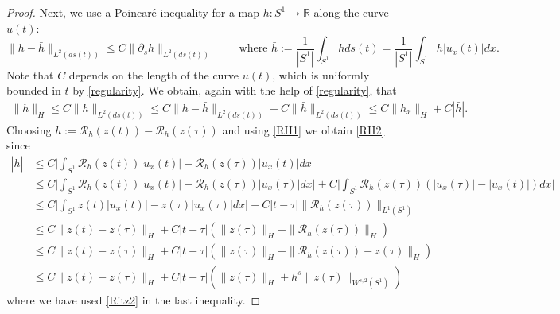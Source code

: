 \documentclass[10pt,a4paper]{amsart}
\def\funch{h}
\newcommand{\R}{\mathbb{R}}
\begin{document}
\begin{proof}
Next, we use a Poincar\'{e}-inequality for a map $\funch:S^{1} \to \R$ along the curve $u(t)$:
$$\| \funch - \bar{h}\|_{L^{2}(ds(t))} \leq C\| \partial_{s} \funch \|_{L^{2}(ds(t))} \qquad \text{ where } \bar{h}:= \frac{1}{|S^{1}|}\int_{S^{1}} \funch ds(t)= \frac{1}{|S^{1}|}\int_{S^{1}} \funch |u_{x}(t)| dx.$$
Note that $C$ depends on the length of the curve $u(t)$, which is uniformly bounded in $t$ by \eqref{regularity}. We obtain, again with the help of \eqref{regularity}, that
\begin{align*}
\|\funch\|_{H} \leq C \| \funch\|_{L^{2}(ds(t))} \leq C\| \funch - \bar{h}\|_{L^{2}(ds(t))} + C\| \bar{h}\|_{L^{2}(ds(t))} \leq C \| \funch_{x}\|_{H} + C |\bar{h}|.
\end{align*}
Choosing $\funch:=\mathcal{R}_{h} (z(t)) -\mathcal{R}_{h} (z(\tau)) $ and using \eqref{RH1} we obtain \eqref{RH2} since
\begin{align*}
|\bar{h}| &\leq C \Big|\int_{S^{1}} \mathcal{R}_{h} (z(t)) |u_{x}(t)| - \mathcal{R}_{h} (z(\tau)) |u_{x}(t)| dx \Big|\\
&\leq C \Big|\int_{S^{1}} \mathcal{R}_{h} (z(t)) |u_{x}(t)| - \mathcal{R}_{h} (z(\tau)) |u_{x}(\tau)| dx \Big| + C \Big|\int_{S^{1}} \mathcal{R}_{h} (z(\tau)) ( |u_{x}(\tau)| - |u_{x}(t)|) dx \Big|\\
& \leq C \Big|\int_{S^{1}} z(t) |u_{x}(t)| - z(\tau) |u_{x}(\tau)| dx \Big| + C |t -\tau| \| \mathcal{R}_{h} (z(\tau)) \|_{L^{1}(S^{1})}\\
& \leq C \| z(t) -z(\tau)\|_{H} + C |t -\tau| ( \| z(\tau)\|_{H} +\| \mathcal{R}_{h} (z(\tau)) \|_{H} )\\
&\leq C \| z(t) -z(\tau)\|_{H} + C |t -\tau| ( \| z(\tau)\|_{H} +\| \mathcal{R}_{h} (z(\tau)) -z(\tau)\|_{H} )\\
& \leq C \| z(t) -z(\tau)\|_{H} + C |t -\tau| (\| z(\tau)\|_{H} +h^{s}\| z(\tau)\|_{W^{s,2}(S^{1})})
\end{align*}
where we have used \eqref{Ritz2} in the last inequality.


\end{proof}
\end{document}
